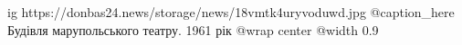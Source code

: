  
 
 
 
 

\ifcmt
  ig https://donbas24.news/storage/news/18vmtk4uryvoduwd.jpg
	@caption_here Будівля марупольського театру. 1961 рік
  @wrap center
  @width 0.9
\fi
